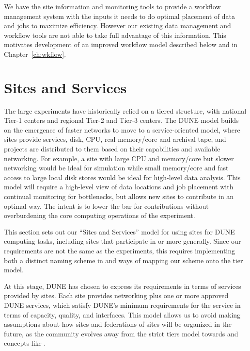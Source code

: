 \documentclass[../main-v1.tex]{subfiles}
\begin{document}
We have the site information and monitoring tools to provide a workflow management system with the inputs it needs to do optimal placement of data and jobs to maximize efficiency. However our existing data management and workflow tools are not able to take full advantage of this information.  This motivates development of an improved workflow model described below and in Chapter~\ref{ch:wkflow}.



\section{Sites and Services }
\label{sec:cm:sites_and_services}  %


The large  experiments have historically relied on a tiered structure, with national Tier-1 centers %
and regional Tier-2 and Tier-3 centers.  The DUNE model builds on the emergence of faster networks to move to  a service-oriented model, where sites provide services, disk, CPU, real memory/core and archival tape, and projects are  distributed to them based on their capabilities and available networking.  For example, a site with large CPU and memory/core but slower networking would be ideal for simulation while small memory/core and fast access to large local disk stores would be ideal for high-level data analysis.  This model will require a high-level view of data locations and job placement with continual monitoring for bottlenecks, but allows new sites to contribute in an optimal way. The intent is to lower the bar for contributions without overburdening the core computing operations of the experiment.

This section sets out our ``Sites and Services'' model for using sites for DUNE computing tasks, including sites that participate in  or  more generally. Since our requirements are not the same as the  experiments, this %
requires implementing both a distinct naming scheme in
 and ways of mapping our scheme onto the  tier model.

At this stage, DUNE has chosen to express its requirements in terms of services provided by sites. Each site provides networking plus one or more approved DUNE services, which satisfy DUNE's minimum requirements for the service in terms of capacity, quality, and interfaces. This model allows us to avoid making assumptions about how sites and federations of sites will be organized in the future, as the community evolves away from the strict  tiers model towards  and concepts like %
.
\end{document}
